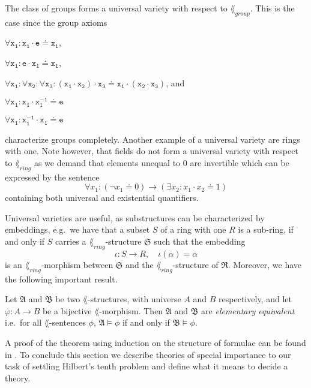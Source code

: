 \begin{exam}
  The class of groups forms a universal variety with respect to
  \(\lang_{group}\). This is the case since the group axioms
  \begin{clist}
    \item \(\mathtt{∀ x_1 : x_1 \cdot e \doteq x_1}\),
    \item \(\mathtt{∀ x_1 : e \cdot x_1 \doteq x_1}\),
    \item \(\mathtt{∀ x_1 : ∀ x_2 : ∀ x_3 : (x_1 \cdot x_2) \cdot x_3 \doteq x_1 \cdot (x_2 \cdot x_3)}\), and
    \item \(\mathtt{∀ x_1 : x_1 \cdot x_1^{-1} \doteq e}\)
    \item \(\mathtt{∀ x_1 : x_1^{-1} \cdot x_1 \doteq e}\)
  \end{clist}
  characterize groups completely. Another example of a universal variety are
  rings with one. Note however, that fields do not form a universal variety with
  respect to \(\lang_{ring}\) as we demand that elements unequal to \(0\) are
  invertible which can be expressed by the sentence
  \[
    ∀ x_1 : (¬ x_1 \doteq 0) → (∃ x_2 : x_1 \cdot x_2 \doteq 1)
  \]
  containing both universal and existential quantifiers.
\end{exam}

Universal varieties are useful, as substructures can be characterized by
embeddings, e.g.\ we have that a subset \(S\) of a ring with one \(R\) is a
sub-ring, if and only if \(S\) carries a \(\lang_{ring}\)-structure
\(\mathfrak{S}\) such that the embedding
\[
  ι: S → R, \quad ι(α) = α
\]
is an \(\lang_{ring}\)-morphism between \(\mathfrak{S}\) and the
\(\lang_{ring}\)-structure of \(\mathfrak{R}\). Moreover, we have the following
important result.

\begin{thm}\label{thm:elementary equivalence}
  Let \(\mathfrak{A}\) and \(\mathfrak{B}\) be two \(\lang\)-structures, with
  universe \(A\) and \(B\) respectively, and let \(φ: A → B\) be a bijective
  \(\lang\)-morphism. Then \(\mathfrak{A}\) and \(\mathfrak{B}\) are
  \emph{elementary equivalent} i.e.\ for all \(\lang\)-sentences
  \(ϕ\), \(\mathfrak{A} \models ϕ\) if and only if \(\mathfrak{B} \models ϕ\).
\end{thm}

A proof of the theorem using induction on the structure of formulae can be found
in \cite[Thm~1.1.10]{Marker2002}. To conclude this section we describe theories
of special importance to our task of settling Hilbert's tenth problem and define
what it means to decide a theory.

